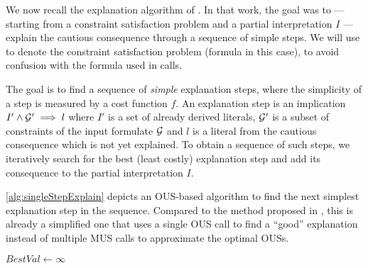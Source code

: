 
We now recall the explanation algorithm of \citet{ecai/BogaertsGCG20}. 
In that work, the goal was to --- starting from a constraint satisfaction problem and a partial interpretation $I$ --- explain the cautious consequence through a sequence of simple steps. 
We will use \formulag to denote the constraint satisfaction problem (formula in this case), to avoid confusion with the formula \formula used in \omus calls.

The goal is to find a sequence of \textit{simple} explanation steps, where the simplicity of a step is measured by a cost function $f$. 
An explanation step is an implication $I' \wedge \mathcal{G} ' \implies l$ where $I'$ is a set of already derived literals, $\mathcal{G} '$ is a subset of constraints of the input formulate $\mathcal{G} $ and $l$ is a literal from the cautious consequence which is not yet explained.
To obtain a sequence of such steps, we iteratively search for the best (least costly) explanation step and add its consequence to the partial interpretation $I$.

\cref{alg:singleStepExplain} depicts an OUS-based algorithm to find the next simplest explanation step in the sequence. 
Compared to the method proposed in \cite{ecai/BogaertsGCG20}, this is already a simplified one that uses a single OUS call to find a ``good'' explanation instead of multiple MUS calls to approximate the optimal OUSs. 


% 
% 



\begin{algorithm}[ht]
$    \mathit{BestVal}\gets\infty$\;
    
    \caption{$\call{SingleStepExplain}(\formulag,f,I)$}
  \label{alg:singleStepExplain}
  \label{alg:explainSingleStep}
\end{algorithm}

